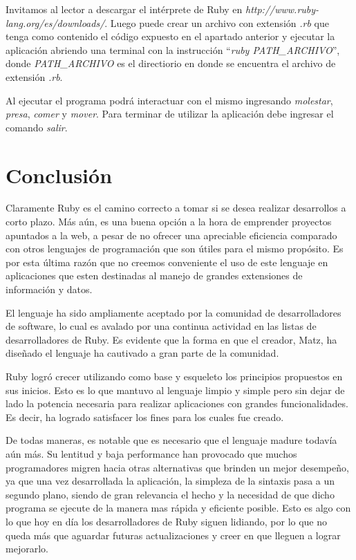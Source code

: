 \documentclass{article}
\begin{document}
	Invitamos al lector a descargar el intérprete de Ruby en \textit{http://www.ruby-lang.org/es/downloads/}. Luego puede crear un archivo con extensión \textit{.rb} que tenga como contenido el código expuesto en el apartado anterior y ejecutar la aplicación abriendo una terminal con la instrucción ``\textit{ruby PATH\_ARCHIVO}'', donde \textit{PATH\_ARCHIVO} es el directiorio en donde se encuentra el archivo de extensión \textit{.rb}.
	 \par
	Al ejecutar el programa podrá interactuar con el mismo ingresando \textit{molestar}, \textit{presa}, \textit{comer} y \textit{mover}. Para terminar de utilizar la aplicación debe ingresar el comando \textit{salir}.
\bigskip




\section{Conclusión}

	Claramente Ruby es el camino correcto a tomar si se desea realizar desarrollos a corto plazo. Más aún, es una buena opción a la hora de emprender proyectos apuntados a la web, a pesar de no ofrecer una apreciable eficiencia comparado con otros lenguajes de programación que son útiles para el mismo propósito. Es por esta última razón que no creemos conveniente el uso de este lenguaje en aplicaciones que esten destinadas al manejo de grandes extensiones de información y datos.
	\par
	El lenguaje ha sido ampliamente aceptado por la comunidad de desarrolladores de software, lo cual es avalado por una continua actividad en las listas de desarrolladores de Ruby. Es evidente que la forma en que el creador, Matz, ha diseñado el lenguaje ha cautivado a gran parte de la comunidad.
	\par
	Ruby logró crecer utilizando como base y esqueleto los principios propuestos en sus inicios. Esto es lo que mantuvo al lenguaje limpio y simple pero sin dejar de lado la potencia necesaria para realizar aplicaciones con grandes funcionalidades. Es decir, ha logrado satisfacer los fines para los cuales fue creado.
	\par
	De todas maneras, es notable que es necesario que el lenguaje madure todavía aún más. Su lentitud y baja performance han provocado que muchos programadores migren hacia otras alternativas que brinden un mejor desempeño, ya que una vez desarrollada la aplicación, la simpleza de la sintaxis pasa a un segundo plano, siendo de gran relevancia el hecho y la necesidad de que dicho programa se ejecute de la manera mas rápida y eficiente posible. Esto es algo con lo que hoy en día los desarrolladores de Ruby siguen lidiando, por lo que no queda más que aguardar futuras actualizaciones y creer en que lleguen a lograr mejorarlo.
\end{document}
